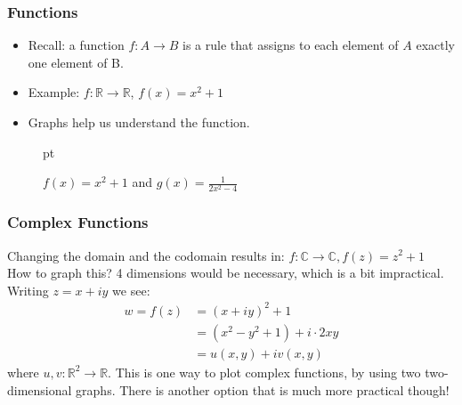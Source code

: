 \documentclass{article}
\begin{document}
\subsubsection{Functions}
\begin{itemize}
\item Recall: a function $f : A \to B$ is a rule that assigns to each element of $A$ exactly one element of B.
\item Example: $f : \mathbb{R} \to \mathbb{R}$, $f(x) = x^2 + 1$
\item Graphs help us understand the function.
\end{itemize}
\begin{figure}[h]
\centering
{}
 pt %
\caption{$f(x) = x^2 + 1$ and $g(x) = \frac{1}{2x^2-4}$}
\end{figure}

\newpage
\subsubsection{Complex Functions}
Changing the domain and the codomain results in: $f : \mathbb{C} \to \mathbb{C}, f(z) = z^2 + 1$\\
How to graph this? 4 dimensions would be necessary, which is a bit impractical.\\
Writing $z = x + iy$ we see:
\begin{align*}
w = f(z) &= (x + iy)^2 + 1\\
&= (x^2 - y^2 + 1) + i \cdot 2xy \\
&= u(x,y) + iv(x,y)
\end{align*}
where $u,v : \mathbb{R}^2 \to \mathbb{R}$. This is one way to plot complex functions, by using two two-dimensional graphs. There is another option that is much more practical though!
\end{document}
